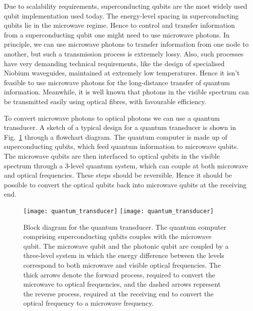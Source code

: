 
Due to scalability requirements, superconducting qubits are the most widely used qubit implementation used today. The energy-level spacing in superconducting qubits lie in the microwave regime. Hence to control and transfer information from a superconducting qubit one might need to use microwave photons. In principle, we can use microwave photons to transfer information from one node to another, but such a transmission process is extremely lossy. Also, such processes have very demanding technical requirements, like the design of specialised Niobium waveguides, maintained at extremely low temperatures. Hence it isn't feasible to use microwave photons for the long-distance transfer of quantum information. Meanwhile, it is well known that photons in the visible spectrum can be transmitted easily using optical fibres, with favourable efficiency.

To convert microwave photons to optical photons we can use a quantum transducer. A sketch of a typical design for a quantum transducer is shown in Fig.~\ref{fig:quantum_transducer} through a flowchart diagram. The quantum computer is made up of superconducting qubits, which feed quantum information to microwave qubits. The microwave qubits are then interfaced to optical qubits in the visible spectrum through a 3-level quantum system, which can couple at both microwave and optical frequencies. These steps should be reversible. Hence it should be possible to convert the optical qubits back into microwave qubits at the receiving end. 

\begin{figure}[!htbp]
\pubmode
\texttt{[image: quantum\_transducer]}
\else
\texttt{[image: quantum\_transducer]}
\fi
\caption{Block diagram for the quantum transducer. The quantum computer comprising superconducting qubits couples with the microwave qubit. The microwave qubit and the photonic qubit are coupled by a three-level system in which the energy difference between the levels correspond to both microwave and visible optical frequencies. The thick arrows denote the forward process, required to convert the microwave to optical frequencies, and the dashed arrows represent the reverse process, required at the receiving end to convert the optical frequency to a microwave frequency.}\label{fig:quantum_transducer}
\end{figure}

